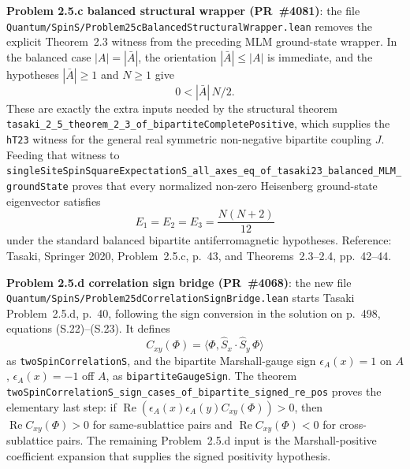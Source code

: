 \documentclass[a4paper,11pt]{article}
\begin{document}
\textbf{Problem 2.5.c balanced structural wrapper (PR~\#4081)}:
the file
\texttt{Quantum/SpinS/Problem25cBalancedStructuralWrapper.lean} removes the
explicit Theorem~2.3 witness from the preceding MLM ground-state wrapper.
In the balanced case \(|A|=|\bar A|\), the orientation
\(|\bar A|\le |A|\) is immediate, and the hypotheses
\(|\bar A|\ge 1\) and \(N\ge 1\) give
\[
  0 < |\bar A|\,N/2 .
\]
These are exactly the extra inputs needed by the structural theorem
\texttt{tasaki\_2\_5\_theorem\_2\_3\_of\_bipartiteCompletePositive}, which
supplies the \texttt{hT23} witness for the general real symmetric
non-negative bipartite coupling \(J\).  Feeding that witness to
\texttt{singleSiteSpinSquareExpectationS\_all\_axes\_eq\_of\_tasaki23\_balanced\_MLM\_groundState}
proves that every normalized non-zero Heisenberg ground-state eigenvector
satisfies
\[
  E_1=E_2=E_3=\frac{N(N+2)}{12}
\]
under the standard balanced bipartite antiferromagnetic hypotheses.
Reference: Tasaki, Springer 2020, Problem~2.5.c, p.~43, and
Theorems~2.3--2.4, pp.~42--44.

\textbf{Problem 2.5.d correlation sign bridge (PR~\#4068)}:
the new file \texttt{Quantum/SpinS/Problem25dCorrelationSignBridge.lean}
starts Tasaki Problem~2.5.d, p.~40, following the sign conversion in the
solution on p.~498, equations (S.22)--(S.23).  It defines
\[
  C_{xy}(\Phi)=
  \langle\Phi,\hat S_x\cdot\hat S_y\,\Phi\rangle
\]
as \texttt{twoSpinCorrelationS}, and the bipartite Marshall-gauge sign
\(\epsilon_A(x)=1\) on \(A\), \(\epsilon_A(x)=-1\) off \(A\), as
\texttt{bipartiteGaugeSign}.  The theorem
\texttt{twoSpinCorrelationS\_sign\_cases\_of\_bipartite\_signed\_re\_pos}
proves the elementary last step:
if \(\operatorname{Re}(\epsilon_A(x)\epsilon_A(y)C_{xy}(\Phi))>0\), then
\(\operatorname{Re} C_{xy}(\Phi)>0\) for same-sublattice pairs and
\(\operatorname{Re} C_{xy}(\Phi)<0\) for cross-sublattice pairs.  The remaining
Problem~2.5.d input is the Marshall-positive coefficient expansion that
supplies the signed positivity hypothesis.
\end{document}
